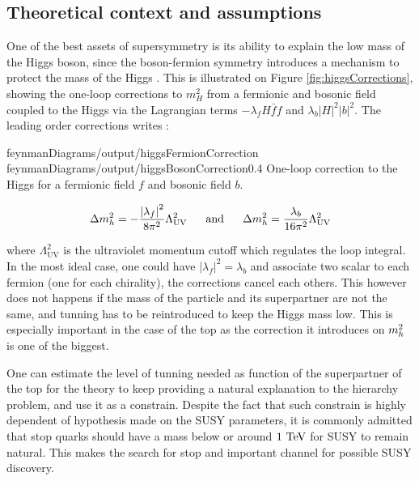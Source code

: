         \subsection{Theoretical context and assumptions}


        One of the best assets of supersymmetry is its ability to explain the low mass
        of the Higgs boson, since the boson-fermion symmetry introduces a mechanism to
        protect the mass of the Higgs . This is illustrated on Figure
        \ref{fig:higgsCorrections}, showing the one-loop corrections to $m_H^2$
        from a fermionic and bosonic field coupled to the Higgs via the Lagrangian terms
        $- \lambda_f H \bar{f} f$ and $\lambda_b \left| H \right|^2 \left| b \right|^2$.
        The leading order corrections writes :

        {feynmanDiagrams/output/higgsFermionCorrection}
        {feynmanDiagrams/output/higgsBosonCorrection}{0.4}
        {One-loop correction to the Higgs for a fermionic field $f$ and bosonic field $b$.}

        \begin{equation}
            \Delta m_{h}^2 = - \frac{\left| \lambda_f \right|^2}{8\pi^2} \Lambda^2_{\text{UV}}
            \, \, \, \, \, \, \, \, \, \, \text{and} \, \, \, \, \, \, \, \, \, \,
            \Delta m_{h}^2 =   \frac{\lambda_b}{16\pi^2} \Lambda^2_{\text{UV}}
        \end{equation}

        where $\Lambda^2_{\text{UV}}$ is the ultraviolet momentum cutoff which regulates
        the loop integral. In the most ideal case, one could have $\left| \lambda_f \right|^2
        = \lambda_b$ and associate two scalar to each fermion (one for each chirality), 
        the corrections cancel each others. 
        This however does not happens if the mass of the particle and its superpartner 
        are not the same, and tunning has to be reintroduced to keep the Higgs mass low.
        This is especially important in the case of the top as the correction it introduces
        on $m_{h}^2$ is one of the biggest. 
        
        One can estimate the level of tunning needed as function of the superpartner of
        the top for the theory to keep providing a natural explanation to the hierarchy
        problem, and use it as a constrain. Despite the fact that such constrain is 
        highly dependent of hypothesis made on the SUSY parameters, it is commonly admitted 
        that stop quarks should have a mass below or around $1~\text{TeV}$ for SUSY to remain natural.
        This makes the search for stop and important channel for possible SUSY discovery.


